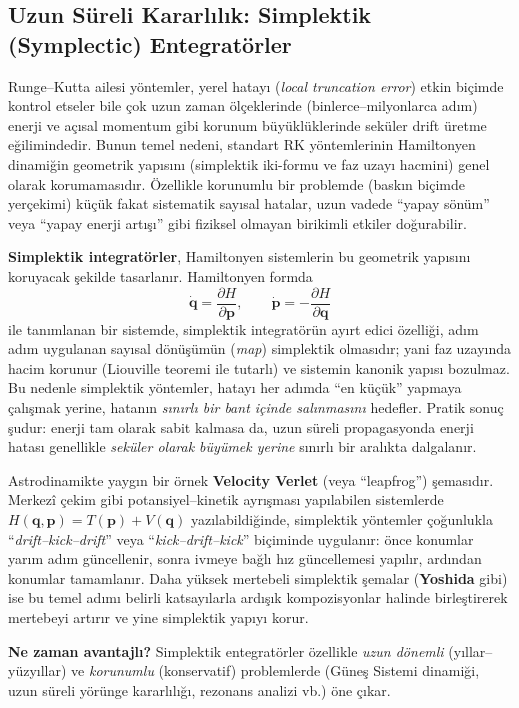 \subsection{Uzun Süreli Kararlılık: Simplektik (Symplectic) Entegratörler}

Runge--Kutta ailesi yöntemler, yerel hatayı (\emph{local truncation error}) etkin biçimde kontrol etseler bile
çok uzun zaman ölçeklerinde (binlerce--milyonlarca adım) enerji ve açısal momentum gibi korunum büyüklüklerinde
seküler drift üretme eğilimindedir. Bunun temel nedeni, standart RK yöntemlerinin Hamiltonyen dinamiğin geometrik
yapısını (simplektik iki-formu ve faz uzayı hacmini) genel olarak korumamasıdır. Özellikle korunumlu bir problemde
(baskın biçimde yerçekimi) küçük fakat sistematik sayısal hatalar, uzun vadede ``yapay sönüm'' veya ``yapay enerji artışı''
gibi fiziksel olmayan birikimli etkiler doğurabilir.

\textbf{Simplektik integratörler}, Hamiltonyen sistemlerin bu geometrik yapısını koruyacak şekilde tasarlanır.
Hamiltonyen formda
\[
\dot{\mathbf{q}}=\frac{\partial H}{\partial \mathbf{p}},\qquad
\dot{\mathbf{p}}=-\frac{\partial H}{\partial \mathbf{q}}
\]
ile tanımlanan bir sistemde, simplektik integratörün ayırt edici özelliği, adım adım uygulanan sayısal dönüşümün
(\emph{map}) simplektik olmasıdır; yani faz uzayında hacim korunur (Liouville teoremi ile tutarlı) ve sistemin
kanonik yapısı bozulmaz. Bu nedenle simplektik yöntemler, hatayı her adımda ``en küçük'' yapmaya çalışmak yerine,
hatanın \emph{sınırlı bir bant içinde salınmasını} hedefler. Pratik sonuç şudur: enerji tam olarak sabit kalmasa da,
uzun süreli propagasyonda enerji hatası genellikle \emph{seküler olarak büyümek yerine} sınırlı bir aralıkta dalgalanır.

Astrodinamikte yaygın bir örnek \textbf{Velocity Verlet} (veya ``leapfrog'') şemasıdır. Merkezî çekim gibi
potansiyel--kinetik ayrışması yapılabilen sistemlerde
$H(\mathbf{q},\mathbf{p})=T(\mathbf{p})+V(\mathbf{q})$ yazılabildiğinde,
simplektik yöntemler çoğunlukla ``\textit{drift--kick--drift}'' veya ``\textit{kick--drift--kick}'' biçiminde
uygulanır: önce konumlar yarım adım güncellenir, sonra ivmeye bağlı hız güncellemesi yapılır, ardından konumlar
tamamlanır. Daha yüksek mertebeli simplektik şemalar (\textbf{Yoshida} gibi) ise bu temel adımı belirli katsayılarla
ardışık kompozisyonlar halinde birleştirerek mertebeyi artırır ve yine simplektik yapıyı korur.

\medskip
\noindent\textbf{Ne zaman avantajlı?}
Simplektik entegratörler özellikle \emph{uzun dönemli} (yıllar--yüzyıllar) ve \emph{korunumlu} (konservatif)
problemlerde (Güneş Sistemi dinamiği, uzun süreli yörünge kararlılığı, rezonans analizi vb.) öne çıkar.

